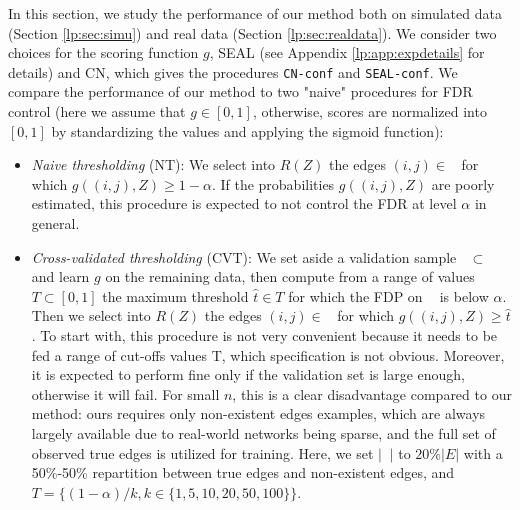 \documentclass[a4paper, 11pt]{article}
\theoremstyle{remark}
\DeclareMathOperator{\Dtr}{\cD_{\text{train}}}
\DeclareMathOperator{\Dtest}{\cD_{\text{test}}}
\DeclareMathOperator{\Dval}{\cD_{\text{val}}}
\newcommand{\EM}{\ensuremath}
\newcommand{\cD}{\EM{\mathcal{D}}}
\begin{document}
In this section, we study the performance of our method both on simulated data (Section \ref{lp:sec:simu}) and real data (Section \ref{lp:sec:realdata}). We consider two choices for the scoring function $g$, SEAL \citep{zhang2018link}  (see Appendix \ref{lp:app:expdetails} for details) and CN, which gives the procedures \texttt{CN-conf} and \texttt{SEAL-conf}. 
We compare the performance of our method to two "naive" procedures for FDR control (here we assume that $g \in [0,1]$, otherwise, scores are normalized into $[0,1]$ by standardizing the values and applying the sigmoid function): %
\begin{itemize}
\item \textit{Naive thresholding} (NT): We select into $R(Z)$ the edges $(i,j) \in \Dtest$ for which $ g((i,j), Z) \geq 1-\alpha$. %
If the probabilities $g((i,j), Z)$ are poorly estimated, this procedure is expected to not control the FDR at level $\alpha$ in general.
\item \textit{Cross-validated thresholding} (CVT): We set aside a validation sample $\Dval \subset \Dtr$ and learn $g$ on the remaining data, then compute from a range of values $T \subset [0,1]$  the maximum threshold $\hat t \in T$ for which the FDP on $\Dval$ is below $\alpha$. Then we select into $R(Z)$ the edges $(i,j) \in \Dtest$ for which $ g((i,j), Z) \geq \hat t$. To start with, this procedure is not very convenient because it needs to be fed a range of cut-offs values T, which specification is not obvious. Moreover, it is expected to perform fine only if the validation set is large enough, otherwise it will fail. For small $n$, this is a clear disadvantage compared to our method: ours requires only non-existent edges examples, which are always largely available due to real-world networks being sparse, and the full set of observed true edges is utilized for training. Here, we set $\vert \Dval \vert$ to $20\% \vert E \vert$ with a 50\%-50\% repartition between true edges and non-existent edges, and $T = \{ (1-\alpha)/k, k \in \{1, 5, 10, 20, 50, 100 \} \} $.

\end{itemize}

\end{document}
